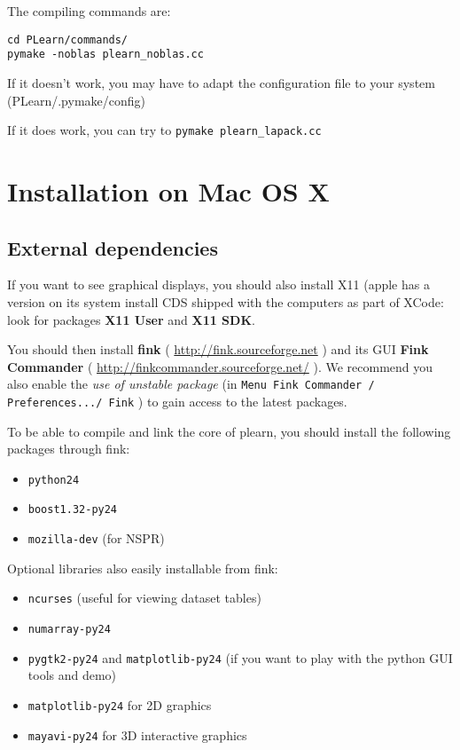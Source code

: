 \documentclass[11pt]{book}
\begin{document}
The compiling commands are:
\begin{verbatim}
cd PLearn/commands/
pymake -noblas plearn_noblas.cc
\end{verbatim}

If it doesn't work, you may have to adapt the configuration file to your system
(PLearn/.pymake/config)

If it does work, you can try to \verb!pymake plearn_lapack.cc!


\section{Installation on Mac OS X}

\subsection{External dependencies}
If you want to see graphical displays, you should also install X11 (apple
has a version on its system install CDS shipped with the computers as part
of XCode: look for packages {\bf X11 User} and {\bf X11 SDK}.

You should then install {\bf fink} ( \url{http://fink.sourceforge.net} )
and its GUI {\bf Fink Commander} ( \url{http://finkcommander.sourceforge.net/} ).
We recommend you also enable the {\em use of unstable package} (in {\tt Menu Fink
Commander / Preferences.../ Fink} ) to gain access to the latest packages.

To be able to compile and link the core of plearn, you should install the
following packages through fink:
\begin{itemize}
\item {\tt python24}
\item {\tt boost1.32-py24}
\item {\tt mozilla-dev} (for NSPR)
\end{itemize}

Optional libraries also easily installable from fink:
\begin{itemize}
\item {\tt ncurses}  (useful for viewing dataset tables)
\item {\tt numarray-py24}
\item {\tt pygtk2-py24}  and  {\tt matplotlib-py24}  (if you want to play with the
  python GUI tools and demo)
\item {\tt matplotlib-py24} for 2D graphics
\item {\tt mayavi-py24} for 3D interactive graphics
\end{itemize}
\end{document}
